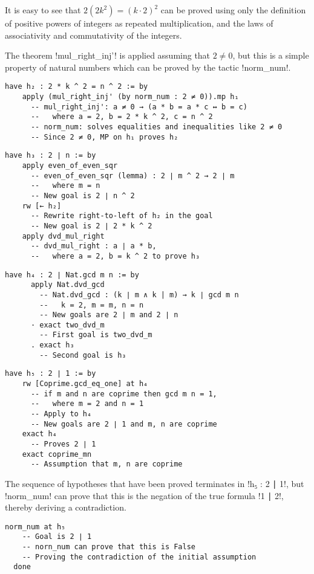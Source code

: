 It is easy to see that $2(2k^2)=(k\cdot 2)^2$ can be proved using only the definition of positive powers of integers as repeated multiplication, and the laws of associativity and commutativity of the integers.

The theorem !mul_right_inj'! is applied assuming that $2\neq 0$, but this is a simple property of natural numbers which can be proved by the tactic !norm_num!.
\begin{Verbatim}[firstnumber=last]
  have h₂ : 2 * k ^ 2 = n ^ 2 := by
    apply (mul_right_inj' (by norm_num : 2 ≠ 0)).mp h₁
      -- mul_right_inj': a ≠ 0 → (a * b = a * c ↔ b = c)
      --   where a = 2, b = 2 * k ^ 2, c = n ^ 2
      -- norm_num: solves equalities and inequalities like 2 ≠ 0
      -- Since 2 ≠ 0, MP on h₁ proves h₂
\end{Verbatim}


\begin{Verbatim}[firstnumber=last]
  have h₃ : 2 ∣ n := by
    apply even_of_even_sqr
      -- even_of_even_sqr (lemma) : 2 ∣ m ^ 2 → 2 ∣ m
      --   where m = n
      -- New goal is 2 ∣ n ^ 2
    rw [← h₂]
      -- Rewrite right-to-left of h₂ in the goal
      -- New goal is 2 ∣ 2 * k ^ 2
    apply dvd_mul_right
      -- dvd_mul_right : a ∣ a * b,
      --   where a = 2, b = k ^ 2 to prove h₃
\end{Verbatim}
\begin{Verbatim}[firstnumber=last]
    have h₄ : 2 ∣ Nat.gcd m n := by
      apply Nat.dvd_gcd
        -- Nat.dvd_gcd : (k ∣ m ∧ k | m) → k ∣ gcd m n
        --   k = 2, m = m, n = n
        -- New goals are 2 ∣ m and 2 ∣ n
      · exact two_dvd_m
        -- First goal is two_dvd_m
      . exact h₃
        -- Second goal is h₃
\end{Verbatim}
\begin{Verbatim}[firstnumber=last]
  have h₅ : 2 ∣ 1 := by
    rw [Coprime.gcd_eq_one] at h₄
      -- if m and n are coprime then gcd m n = 1,
      --   where m = 2 and n = 1
      -- Apply to h₄
      -- New goals are 2 ∣ 1 and m, n are coprime
    exact h₄
      -- Proves 2 ∣ 1
    exact coprime_mn
      -- Assumption that m, n are coprime
\end{Verbatim}


The sequence of hypotheses that have been proved terminates in !h₅ : 2 ∣ 1!, but !norm_num! can prove that this is the negation of the true formula   !1 ∣ 2!, thereby deriving a contradiction.

\begin{Verbatim}[firstnumber=last]
  norm_num at h₅
    -- Goal is 2 ∣ 1
    -- norn_num can prove that this is False
    -- Proving the contradiction of the initial assumption
  done
\end{Verbatim}

